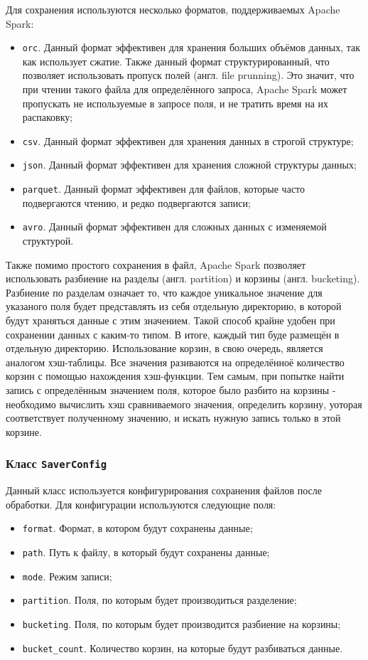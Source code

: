 Для сохранения используются несколько форматов, поддерживаемых Apache Spark:
\begin{itemize}
    \item \texttt{orc}. Данный формат эффективен для хранения больших объёмов данных, так как использует сжатие. Также данный формат структурированный, что позволяет использовать пропуск полей (англ. file prunning). Это значит, что при чтении такого файла для определённого запроса, Apache Spark может пропускать не используемые в запросе поля, и не тратить время на их распаковку;
    \item \texttt{csv}. Данный формат эффективен для хранения данных в строгой структуре;
    \item \texttt{json}. Данный формат эффективен для хранения сложной структуры данных;
    \item \texttt{parquet}. Данный формат эффективен для файлов, которые часто подвергаются чтению, и редко подвергаются записи;
    \item \texttt{avro}. Данный формат эффективен для сложных данных с изменяемой структурой.
\end{itemize}

Также помимо простого сохранения в файл, Apache Spark позволяет использовать разбиение на разделы (англ. partition) и корзины (англ. bucketing).
Разбиение по разделам означает то, что каждое уникальное значение для указаного поля будет представлять из себя отдельную директорию, в которой будут храняться данные с этим значением.
Такой способ крайне удобен при сохранении данных с каким-то типом.
В итоге, каждый тип буде размещён в отдельную директорию.
Использование корзин, в свою очередь, является аналогом хэш-таблицы.
Все значения разиваются на определённоё количество корзин с помощью нахождения хэш-функции.
Тем самым, при попытке найти запись с определённым значением поля, которое было разбито на корзины - необходимо вычислить хэш сравниваемого значения, определить корзину, уоторая соответствует полученному значению, и искать нужную запись только в этой корзине.

\subsubsection{Класс \texttt{SaverConfig}}
Данный класс используется конфигурирования сохранения файлов после обработки.
Для конфигурации используются следующие поля:
\begin{itemize}
    \item \texttt{format}. Формат, в котором будут сохранены данные;
    \item \texttt{path}. Путь к файлу, в который будут сохранены данные;
    \item \texttt{mode}. Режим записи;
    \item \texttt{partition}. Поля, по которым будет производиться разделение;
    \item \texttt{bucketing}. Поля, по которым будет производится разбиение на корзины;
    \item \texttt{bucket\_count}. Количество корзин, на которые будут разбиваться данные.
\end{itemize}

